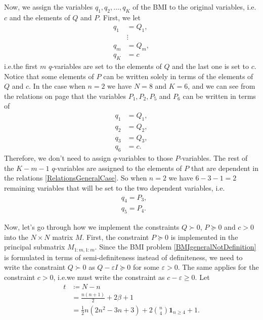 \documentclass[a4paper,12pt,twoside,BCOR=10mm]{scrbook}
\begin{document}
Now, we assign the variables $q_1, q_2, \ldots, q_K$ of the BMI to the original variables, i.e. $c$ and the elements of $Q$ and $P$. First, we let
\begin{align*}
    q_1 &= Q_1,\\
    &\vdots\\
    q_m &= Q_m,\\
    q_K &= c
\end{align*}
i.e.\@ the first $m$ $q$-variables are set to the elements of $Q$ and the last one is set to $c$. Notice that some elements of $P$ can be written solely in terms of the elements of $Q$ and $c$. In the case when $n = 2$ we have $N = 8$ and $K = 6$, and we can see from the relations on page \pageref{RelationsWrittenOut n2} that the variables $P_1, P_2, P_5$ and $P_6$ can be written in terms of
\begin{align*}
    q_1 &= Q_1,\\
    q_2 &= Q_2,\\
    q_3 &= Q_3,\\
    q_6 &= c.
\end{align*}
Therefore, we don't need to assign $q$-variables to those $P$-variables. The rest of the $K - m - 1$ $q$-variables are assigned to the elements of $P$ that are dependent in the relations \eqref{RelationsGeneralCase}. So when $n = 2$ we have $6 - 3 - 1 = 2$ remaining variables that will be set to the two dependent variables, i.e.
\begin{align*}
    &q_4 = P_3,\\
    &q_5 = P_4.
\end{align*}

Now, let's go through how we implement the constraints $Q\succ 0$, $P \succeq 0$ and $c > 0$ into the $N\times N$ matrix $M$. First, the constraint $P \succeq 0$ is implemented in the principal submatrix $M_{1:m, 1:m}$. Since the BMI problem \eqref{BMIgeneralNotDefinition} is formulated in terms of semi-definiteness instead of definiteness, we need to write the constraint $Q \succ 0$ as $Q - \varepsilon I \succeq 0$ for some $\varepsilon > 0$. The same applies for the constraint $c > 0$, i.e.\@ we must write the constraint as $c - \varepsilon \geq 0$. Let
\begin{align*}
    t &\coloneqq N - n\\
    &= \frac{n(n+1)}{2} + 2\beta + 1\\
    &= \frac{1}{2}n(2n^2 - 3n + 3) + 2\binom{n}{4}\mathbf{1}_{n\geq 4} + 1.
\end{align*}
\end{document}
